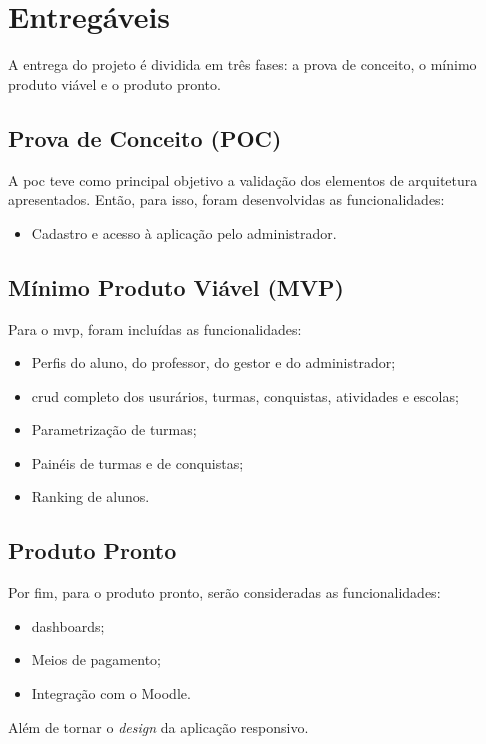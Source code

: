\section{Entregáveis}
A entrega do projeto é dividida em três fases: a prova de conceito, o mínimo produto viável e o produto pronto.

\subsection{Prova de Conceito (POC)}
A \ac{poc} teve como principal objetivo a validação dos elementos de arquitetura apresentados. Então, para isso, foram desenvolvidas as funcionalidades:
 \begin{itemize}
     \item Cadastro e acesso à aplicação pelo administrador.
 \end{itemize}

\subsection{Mínimo Produto Viável (MVP)}
Para o \ac{mvp}, foram incluídas as funcionalidades:
\begin{itemize}
    \item Perfis do aluno, do professor, do gestor e do administrador;
    \item \ac{crud} completo dos usurários, turmas, conquistas, atividades e escolas;
    \item Parametrização de turmas;
    \item Painéis de turmas e de conquistas;
    \item Ranking de alunos.
\end{itemize}

\subsection{Produto Pronto}
Por fim, para o produto pronto, serão consideradas as funcionalidades:

\begin{itemize}
    \item \glspl{dashboard};
    \item Meios de pagamento;
    \item Integração com o Moodle.
\end{itemize}

Além de tornar o \textit{design} da aplicação responsivo.